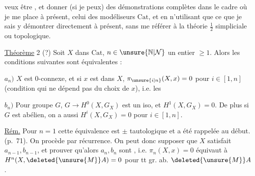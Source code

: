 
veux être , et donner (si je peux) des démonstrations complètes dans le cadre où je me place à présent, celui des modéliseurs $\mathrm{Cat}$, et en n'utilisant que ce que je sais y démontrer directement à présent, sans me référer à  la théorie $\frac12$ simpliciale ou topologique.

\uline{Théorème} 2 (?) Soit $X$ dans $\mathrm{Cat}$, $n\in\unsure{\mathbb N|\mathcal N}$ un entier $\geqslant 1$. Alors les conditions suivantes sont équivalentes :

$a_n)$ $X$ est $0$-connexe, et  si $x$ est dans $X$, $\pi_{\unsure{i|n}}(X,x)=0$ pour $i\in[1,n]$ (condition qui ne dépend pas du choix de $x$), i.e. les 

$b_n)$ Pour    groupe  $G$, $G\longrightarrow H^0(X,G_X)$ est un iso, et  $H^1(X,G_X)=0$. De plus si $G$ est abélien, on a aussi $H^i(X,G_X)=0$ pour $i\in[1,n]$.

\uline{Rém.} Pour $n=1$ cette équivalence est $\pm$ tautologique et a été rappelée  au début. (p.~71). On procède par récurrence. On peut donc supposer que  $X$ satisfait $a_{n-1},b_{n-1}$, et prouver qu'alors $a_n,b_n$ sont , i.e. $\pi_n(X,x)=0$ équivaut à $H^n(X,\deleted{\unsure{M}}A)=0$ pour tt gr. ab. $\deleted{\unsure{M}}A$.
